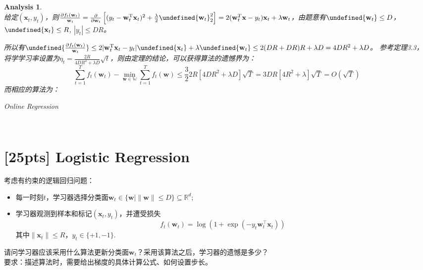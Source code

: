 \documentclass[a4paper,UTF8]{article}
\let\norm\undefined %
\DeclarePairedDelimiter\norm{\lVert}{\rVert}
\numberwithin{equation}{section}
\newtheorem*{myAnalysis}{Analysis}
\begin{document}
\begin{myAnalysis}~\\

给定$(\mathbf{x}_t, y_t)$，则$\frac{\partial f_t(\mathbf{w}_t)}{\mathbf{w}_t} = \frac{\partial}{\partial \mathbf{w}_t}\left[ (y_t - \mathbf{w}_t^\mathrm{T} \mathbf{x}_t)^2 + \frac{\lambda}{2} \norm{\mathbf{w}_t}_2^2 \right] = 2(\mathbf{w}_t^T \mathbf{x} - y_t) \mathbf{x}_t + \lambda \mathbf{w}_t$，由题意有$\norm{\mathbf{w}_t} \le D$，$\norm{\mathbf{x}_t} \le R$, $|y_t| \le DR$。

所以有$\norm{\frac{\partial f_t(\mathbf{w}_t)}{\mathbf{w}_t}} \le 2|\mathbf{w}_t^\mathrm{T} \mathbf{x}_t - y_t| \norm{\mathbf{x}_t} + \lambda \norm{\mathbf{w}_t} \le 2(DR + DR) R + \lambda D = 4DR^2 + \lambda D$。
参考定理3.3，将学学习率设置为$\eta_t = \frac{2R}{4DR^2 + \lambda D} \sqrt{t}$，则由定理的结论，可以获得算法的遗憾界为：
\[
\sum_{t=1}^T f_t(\mathbf{w}_t) - \min_{\mathbf{w} \in \mathbb{W}} \sum_{t=1}^T f_t(\mathbf{w}) \le \frac{3}{2} 2R [4DR^2 + \lambda D] \sqrt{T} = 3DR[4R^2 + \lambda] \sqrt{T} = O(\sqrt{T})
\]
而相应的算法为：
\begin{algorithm}  
	\caption{Online Regression}  
	\begin{algorithmic}[1] %
		  \State{ $\mathbf{w}_{t+1} = \frac{D}{\max\{ D, \norm{\mathbf{w}_{t+1}'} \} } \mathbf{w}_{t+1}' $ }
		\EndFor  
	\end{algorithmic} 
\end{algorithm}  

	~\\
\end{myAnalysis}

\newpage
\section{[25pts] Logistic Regression}
\noindent [在线分类] 考虑有约束的逻辑回归问题：
\begin{itemize}
  \item 每一时刻$t$，学习器选择分类面$\mathbf{w}_t \in \{\mathbf{w}| \|\mathbf{w}\| \leq D\} \subseteq \mathbb{R}^d$;
  \item 学习器观测到样本和标记$(\mathbf{x}_t,y_t)$，并遭受损失
  \[
  f_t(\mathbf{w}_t)=\log\left( 1+ \exp(-y_t \mathbf{w}_t^\top \mathbf{x}_t)\right)
  \]
其中$\|\mathbf{x}_t\| \leq R$，$y_t \in \{+1,-1\}$.
\end{itemize}
请问学习器应该采用什么算法更新分类面$\mathbf{w}_t$？采用该算法之后，学习器的遗憾是多少？\\
要求：描述算法时，需要给出梯度的具体计算公式、如何设置步长。
\end{document}
